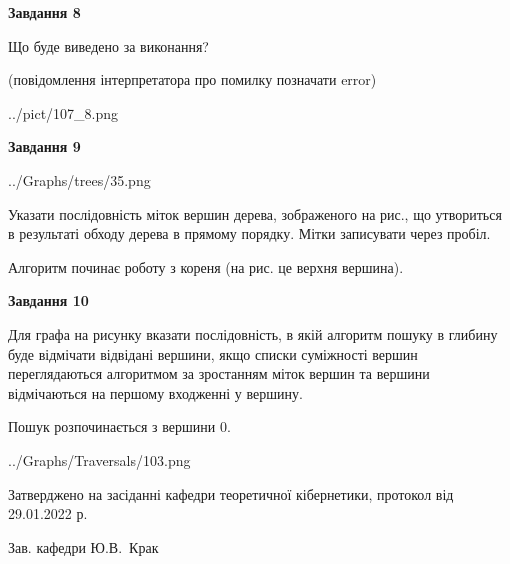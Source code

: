 \documentclass[12pt, ukrainian]{article}
\begin{document}
{\begin {large}
{\begin {center}\textbf{Завдання 8}\end {center}}\par
Що буде виведено за виконання?\par
 (повідомлення інтерпретатора про помилку позначати error)\par
\begin{center}
	{../pict/107_8.png}
\end{center}
\newpage

{\begin {center}\textbf{Завдання 9}\end {center}}\par

\begin{center}
	{../Graphs/trees/35.png}
\end{center}
Указати послідовність міток вершин дерева, зображеного на рис., що утвориться в результаті обходу дерева в прямому порядку. Мітки записувати через пробіл.\par Алгоритм починає роботу з кореня (на рис. це верхня вершина).\par
\newpage

{\begin {center}\textbf{Завдання 10}\end {center}}\par
Для графа на рисунку вказати послідовність, в якій алгоритм пошуку в глибину буде відмічати відвідані вершини, якщо списки суміжності вершин переглядаються алгоритмом за зростанням міток вершин та вершини відмічаються на першому вход\-женні у вершину.\par
Пошук розпочинається з вершини 0.\par

\begin{center}
	{../Graphs/Traversals/103.png}
\end{center}\par
\newpage


\end {large}
}
{\smallskip \begin {small} Затверджено на засіданні кафедри теоретичної кібернетики, протокол  від   29.01.2022 р.\par\smallskip\smallskip
{\parbox {6.5 cm}{Зав. кафедри \dotfill Ю.В.~Крак}} \end{small}}
\end{document}
